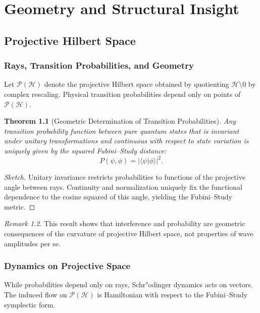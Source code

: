 \documentclass[12pt]{book}
\theoremstyle{plain}
\newtheorem{theorem}{Theorem}[chapter]
\theoremstyle{definition}
\theoremstyle{remark}
\newtheorem{remark}[theorem]{Remark}
\begin{document}
\part{Geometry and Structural Insight}

\chapter{Projective Hilbert Space}

\section{Rays, Transition Probabilities, and Geometry}

Let $\mathcal{P}(\mathcal{H})$ denote the projective Hilbert space obtained by quotienting $\mathcal{H} \setminus {0}$ by complex rescaling. Physical transition probabilities depend only on points of $\mathcal{P}(\mathcal{H})$.

\begin{theorem}[Geometric Determination of Transition Probabilities]
Any transition probability function between pure quantum states that is invariant under unitary transformations and continuous with respect to state variation is uniquely given by the squared Fubini--Study distance:
\[
P(\psi,\phi) = |\langle \psi | \phi \rangle|^2.
\]
\end{theorem}

\begin{proof}[Sketch]
Unitary invariance restricts probabilities to functions of the projective angle between rays. Continuity and normalization uniquely fix the functional dependence to the cosine squared of this angle, yielding the Fubini--Study metric.
\end{proof}

\begin{remark}
This result shows that interference and probability are geometric consequences of the curvature of projective Hilbert space, not properties of wave amplitudes per se.
\end{remark}

\section{Dynamics on Projective Space}

While probabilities depend only on rays, Schr"odinger dynamics acts on vectors. The induced flow on $\mathcal{P}(\mathcal{H})$ is Hamiltonian with respect to the Fubini--Study symplectic form.
\end{document}
